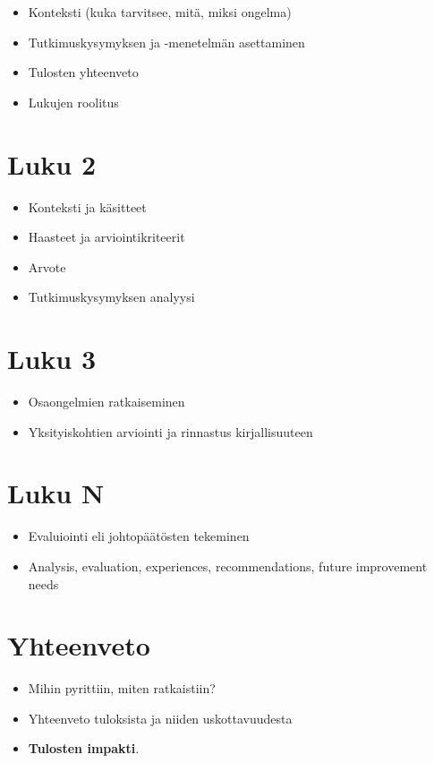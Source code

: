 \documentclass[finnish]{tktltiki2}
\theoremstyle{definition}
\theoremstyle{remark}
\begin{document}
\begin{itemize}
  \item Konteksti (kuka tarvitsee, mitä, miksi ongelma)
  \item Tutkimuskysymyksen ja -menetelmän asettaminen
  \item Tulosten yhteenveto
  \item Lukujen roolitus
\end{itemize}

\section{Luku 2}

\begin{itemize}
  \item Konteksti ja käsitteet
  \item Haasteet ja arviointikriteerit
  \item Arvote
  \item Tutkimuskysymyksen analyysi
\end{itemize}

\section{Luku 3}

\begin{itemize}
  \item Osaongelmien ratkaiseminen
  \item Yksityiskohtien arviointi ja rinnastus kirjallisuuteen
\end{itemize}

\section{Luku N}

\begin{itemize}
  \item Evaluiointi eli johtopäätösten tekeminen
  \item Analysis, evaluation, experiences, recommendations, future improvement needs
\end{itemize}

\section{Yhteenveto}

\begin{itemize}
  \item Mihin pyrittiin, miten ratkaistiin?
  \item Yhteenveto tuloksista ja niiden uskottavuudesta
  \item \textbf{Tulosten impakti}.
\end{itemize}
\end{document}
